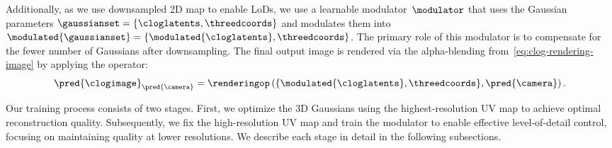     Additionally, as we use downsampled 2D map to enable LoDs, we use a
    learnable modulator~$\modulator$ that uses the Gaussian parameters
    $\gaussianset=\{\cloglatents, \threedcoords\}$ and modulates them into
    $\modulated{\gaussianset}=\{\modulated{\cloglatents},\threedcoords\}$.
    The primary role of this modulator is to compensate for the fewer number
    of Gaussians after downsampling.
    The final output image is rendered via the alpha-blending from~\cref{eq:clog-rendering-image} by applying the operator:
    \begin{equation}
      \pred{\clogimage}_{\pred{\camera}} = \renderingop\left(\{\modulated{\cloglatents}, \threedcoords\}, \pred{\camera}\right).
    \end{equation}

    Our training process consists of two stages.
    First, we optimize the 3D Gaussians using the highest-resolution UV map to
    achieve optimal reconstruction quality.
    Subsequently, we fix the high-resolution UV map and train the modulator to
    enable effective level-of-detail control, focusing on maintaining quality
    at lower resolutions.
    We describe each stage in detail in the following subsections.

